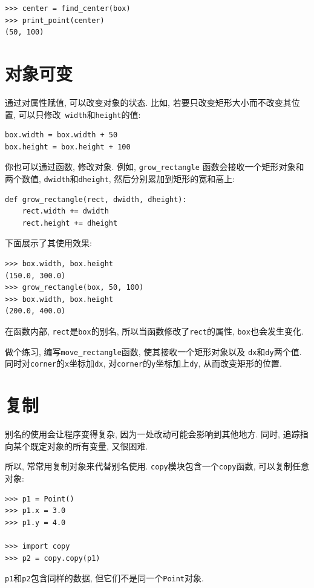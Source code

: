 \documentclass[10pt]{book}
\begin{document}
\begin{verbatim}
>>> center = find_center(box)
>>> print_point(center)
(50, 100)
\end{verbatim}
%

\section{对象可变}

通过对属性赋值, 可以改变对象的状态. 
比如, 若要只改变矩形大小而不改变其位置, 可以只修改{\tt
width}和{\tt height}的值:

\begin{verbatim}
box.width = box.width + 50
box.height = box.height + 100
\end{verbatim}
%
你也可以通过函数, 修改对象. 例如, 
\verb"grow_rectangle" 函数会接收一个矩形对象和两个数值, 
{\tt dwidth}和{\tt dheight}, 然后分别累加到矩形的宽和高上:

\begin{verbatim}
def grow_rectangle(rect, dwidth, dheight):
    rect.width += dwidth
    rect.height += dheight
\end{verbatim}
%
下面展示了其使用效果:

\begin{verbatim}
>>> box.width, box.height
(150.0, 300.0)
>>> grow_rectangle(box, 50, 100)
>>> box.width, box.height
(200.0, 400.0)
\end{verbatim}
%
在函数内部, {\tt rect}是{\tt box}的别名, 所以当函数修改了{\tt rect}的属性, 
{\tt box}也会发生变化. 

做个练习, 编写\verb"move_rectangle"函数, 使其接收一个矩形对象以及
{\tt dx}和{\tt dy}两个值. 
同时对{\tt corner}的{\tt x}坐标加{\tt dx}, 
对{\tt corner}的{\tt y}坐标加上{\tt dy}, 
从而改变矩形的位置. 


\section{复制}
\label{copying}

别名的使用会让程序变得复杂, 因为一处改动可能会影响到其他地方. 
同时, 追踪指向某个既定对象的所有变量, 又很困难. 

所以, 常常用复制对象来代替别名使用. 
{\tt copy}模块包含一个{\tt copy}函数, 可以复制任意对象:

\begin{verbatim}
>>> p1 = Point()
>>> p1.x = 3.0
>>> p1.y = 4.0

>>> import copy
>>> p2 = copy.copy(p1)
\end{verbatim}
%
{\tt p1}和{\tt p2}包含同样的数据, 但它们不是同一个{\tt Point}对象.
\end{document}
